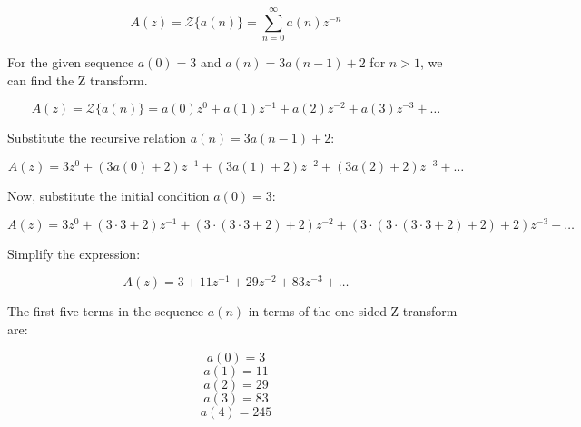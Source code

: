 \documentclass[12pt]{article}
\begin{document}
\[ A(z) = \mathcal{Z}\{a(n)\} = \sum_{n=0}^{\infty} a(n)z^{-n} \]

For the given sequence \(a(0) = 3\) and \(a(n) = 3a(n-1) + 2\) for \(n > 1\), we can find the Z transform.

\[ A(z) = \mathcal{Z}\{a(n)\} = a(0)z^0 + a(1)z^{-1} + a(2)z^{-2} + a(3)z^{-3} + \ldots \]

Substitute the recursive relation \(a(n) = 3a(n-1) + 2\):

\[ A(z) = 3z^0 + (3a(0) + 2)z^{-1} + (3a(1) + 2)z^{-2} + (3a(2) + 2)z^{-3} + \ldots \]

Now, substitute the initial condition \(a(0) = 3\):

\[ A(z) = 3z^0 + (3 \cdot 3 + 2)z^{-1} + (3 \cdot (3 \cdot 3 + 2) + 2)z^{-2} + (3 \cdot (3 \cdot (3 \cdot 3 + 2) + 2) + 2)z^{-3} + \ldots \]

Simplify the expression:

\[ A(z) = 3 + 11z^{-1} + 29z^{-2} + 83z^{-3} + \ldots \]

The first five terms in the sequence \(a(n)\) in terms of the one-sided Z transform are:

\[ a(0) = 3 \]
\[ a(1) = 11 \]
\[ a(2) = 29 \]
\[ a(3) = 83 \]
\[ a(4) = 245 \]
\end{document}
